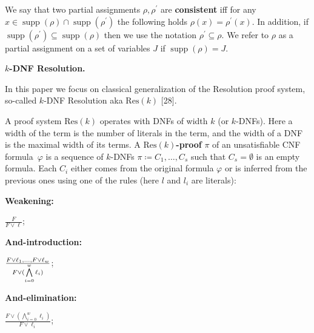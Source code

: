 \documentclass[10pt,a4paper]{article}
\begin{document}
We say that two partial assignments $\rho,\rho^{\prime}$ are \textbf{consistent} iff for any $x\in\operatorname*{supp}(\rho)\cap\operatorname*{supp}(\rho^{\prime})$ the following holds $\rho(x)=\rho^{\prime}(x)$. In addition, if $\operatorname*{supp}(\rho^{\prime})\subseteq\operatorname*{supp}(\rho)$ then we use the notation $\rho^{\prime}\subseteq\rho$. We refer to $\rho$ as a partial assignment
on a set of variables $J$ if $\operatorname*{supp}(\rho)=J$.\par




\par\medskip\noindent\textbf{
$k$-DNF Resolution.}\par




In this paper we focus on classical generalization of the Resolution
proof system, so-called $k$-DNF Resolution aka $\mathrm{Res}(k)$ [28].\par




A proof system $\mathrm{Res}(k)$ operates with DNFs of width $k$ (or $k$-DNFs). Here a width of the term is
the number of literals in the term, and the width of a DNF is the maximal width of its terms. A $\mathrm{Res}(k)$\textbf{-proof} $\pi$
of an unsatisfiable CNF formula $\varphi$ is a sequence of $k$-DNFs $\pi\coloneqq C_{1},\dots,C_{s}$
such that $C_{s}=\emptyset$ is an empty formula. Each $C_{i}$ either comes from the original formula
$\varphi$ or is inferred from the previous ones using one of the rules (here $l$ and $l_{i}$ are literals):\par


\textbf{Weakening:}



$\frac{F}{F\vee\ell}$;\par



\textbf{And}\textbf{-introduction:}



$\frac{F\vee\ell_{1},\dots,F\vee\ell_{w}}{F\vee(\bigwedge\limits_{i=0}^{w}\ell_%
{i})}$;\par



\textbf{And}\textbf{-elimination:}



$\frac{F\vee(\bigwedge\limits_{i=0}^{w}\ell_{i})}{F\vee\ell_{i}}$;\par
\end{document}
